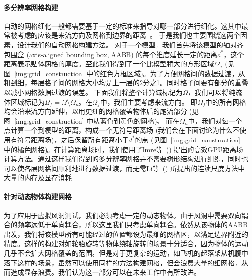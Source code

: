 \paragraph{多分辨率网格构建}
自动的网格细化一般都需要基于一定的标准来指导对哪一部分进行细化。这其中最常被考虑的应该是来流方向及网格到边界的距离~\cite{Sandoval-2012,Li-2019}。
于是我们也主要围绕这两个因素，设计我们的自动网格构建方法。
对于一个模型，我们首先将该模型的轴对齐包围盒 (axis-aligned bounding box, AABB) 的每个维度延长一定的距离$d^*$，这个距离表示贴体网格的厚度。至此我们得到了一个比模型稍大的方形区域$\Omega_n$ (见图~\ref{img:grid_construction} 中的红色方框区域)。为了方便网格间的数据过渡，从粗到细，每层格子间的网格大小均是上一层的2分之1。同时格子间要有部分的重叠以减小网格数据过渡的误差。
下面我们将整个计算域标记为$\Omega$，我们可以将纯流体区域标记为$\Omega_f \!=\! \Omega \setminus \Omega_n$。在$\Omega_f$中，我们主要考虑来流方向。
即$\Omega_f$中的所有网格均会沿来流方向延伸，以用更细的网格覆盖物体后的尾流部分 (见图~\ref{img:grid_construction} 中从蓝色到黄色的网格)。
而在$\Omega_n$中，我们对每一个点计算一个到模型的距离，构成一个无符号距离场 (我们会在下面讨论为什么不使用有符号距离场)，之后保留所有距离小于$d^*$的点 (见图~\ref{img:grid_construction} 中的橘色网格)。在计算距离场时，我们使用了Imre等~(\citeyear{Imre-2017}) 提出的高效GPU距离场计算方法。通过这样我们得到的多分辨率网格并不需要树形结构进行组织，同时也可以使各层网格间顺利地进行数据过渡，而无需Li等~(\citeyear{Li-2019}) 所提出的连续尺度方法中大量的内存及显存消耗

\paragraph{针对动态物体构建网格}
为了应用于虚拟风洞测试，我们必须考虑一定的动态物体。由于风洞中需要双向耦合的频率远低于单向耦合，所以这里我们只考虑单向耦合。依然从该物体的AABB出发，我们将该模型所有可能经过的位置都设为最细的网格区，以满足边界附近的精度。这样的构建对如轮胎旋转等物体绕轴旋转的场景十分适合，因为物体的运动几乎不会扩大网格覆盖的范围。但是对于更复杂的运动，如飞机的起落架从机腹中落下这样的场景，虽然可以使用同样的方法构建网格，但会浪费大量的细网格，从而造成显存浪费。我们认为这一部分可以在未来工作中有所改进。

